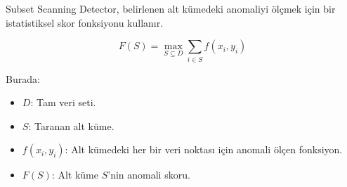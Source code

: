 Subset Scanning Detector, belirlenen alt kümedeki anomaliyi ölçmek için bir istatistiksel skor fonksiyonu kullanır.

\[ F(S) = \max_{S \subseteq D} \sum_{i \in S} f(x_i, y_i) \]

Burada:

\begin{itemize}
    \item $D$: Tam veri seti.
    \item $S$: Taranan alt küme.
    \item $f(x_i, y_i)$: Alt kümedeki her bir veri noktası için anomali ölçen fonksiyon.
    \item $F(S)$: Alt küme $S$'nin anomali skoru.
\end{itemize}

\newpage